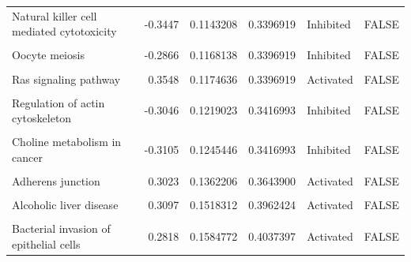 \documentclass[9pt,a4paper,]{extarticle}
\begin{document}
\begin{table}
{\begin{tabular}[t]{lrrrll}
Natural killer cell mediated cytotoxicity & -0.3447 & 0.1143208 & 0.3396919 & Inhibited & FALSE\\
\addlinespace
\cellcolor{gray!6}{Longevity regulating pathway - multiple species} & \cellcolor{gray!6}{0.2782} & \cellcolor{gray!6}{0.1152363} & \cellcolor{gray!6}{0.3396919} & \cellcolor{gray!6}{Activated} & \cellcolor{gray!6}{FALSE}\\
Oocyte meiosis & -0.2866 & 0.1168138 & 0.3396919 & Inhibited & FALSE\\
\cellcolor{gray!6}{Systemic lupus erythematosus} & \cellcolor{gray!6}{0.2844} & \cellcolor{gray!6}{0.1169634} & \cellcolor{gray!6}{0.3396919} & \cellcolor{gray!6}{Activated} & \cellcolor{gray!6}{FALSE}\\
Ras signaling pathway & 0.3548 & 0.1174636 & 0.3396919 & Activated & FALSE\\
\cellcolor{gray!6}{Legionellosis} & \cellcolor{gray!6}{0.3318} & \cellcolor{gray!6}{0.1206566} & \cellcolor{gray!6}{0.3416993} & \cellcolor{gray!6}{Activated} & \cellcolor{gray!6}{FALSE}\\
\addlinespace
Regulation of actin cytoskeleton & -0.3046 & 0.1219023 & 0.3416993 & Inhibited & FALSE\\
\cellcolor{gray!6}{Epstein-Barr virus infection} & \cellcolor{gray!6}{-0.3856} & \cellcolor{gray!6}{0.1230569} & \cellcolor{gray!6}{0.3416993} & \cellcolor{gray!6}{Inhibited} & \cellcolor{gray!6}{FALSE}\\
Choline metabolism in cancer & -0.3105 & 0.1245446 & 0.3416993 & Inhibited & FALSE\\
\cellcolor{gray!6}{Apelin signaling pathway} & \cellcolor{gray!6}{0.2871} & \cellcolor{gray!6}{0.1330388} & \cellcolor{gray!6}{0.3603836} & \cellcolor{gray!6}{Activated} & \cellcolor{gray!6}{FALSE}\\
Adherens junction & 0.3023 & 0.1362206 & 0.3643900 & Activated & FALSE\\
\addlinespace
\cellcolor{gray!6}{Alcoholism} & \cellcolor{gray!6}{0.2735} & \cellcolor{gray!6}{0.1457567} & \cellcolor{gray!6}{0.3850857} & \cellcolor{gray!6}{Activated} & \cellcolor{gray!6}{FALSE}\\
Alcoholic liver disease & 0.3097 & 0.1518312 & 0.3962424 & Activated & FALSE\\
\cellcolor{gray!6}{Central carbon metabolism in cancer} & \cellcolor{gray!6}{-0.2967} & \cellcolor{gray!6}{0.1583378} & \cellcolor{gray!6}{0.4037397} & \cellcolor{gray!6}{Inhibited} & \cellcolor{gray!6}{FALSE}\\
Bacterial invasion of epithelial cells & 0.2818 & 0.1584772 & 0.4037397 & Activated & FALSE\\

\end{tabular}}
\end{table}
\end{document}
